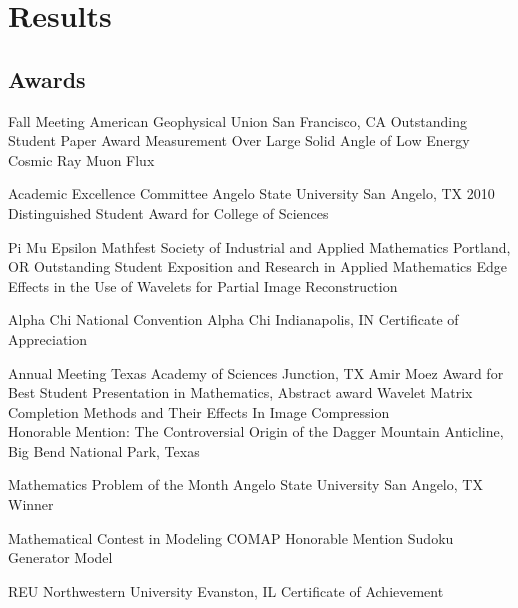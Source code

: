 \documentclass[10pt,letterpaper,english]{moderncv}
\begin{document}
\section{Results}
\subsection{Awards}

{Fall Meeting}
{American Geophysical Union}
{San Francisco, CA}
{Outstanding Student Paper Award}%
{Measurement Over Large Solid Angle of Low Energy Cosmic Ray Muon Flux}

{Academic Excellence Committee}
{Angelo State University}
{San Angelo, TX}
{2010 Distinguished Student Award for College of Sciences}

{Pi Mu Epsilon Mathfest}
{Society of Industrial and Applied Mathematics}
{Portland, OR}
{Outstanding Student Exposition and Research in Applied Mathematics}%
{Edge Effects in the Use of Wavelets for Partial Image Reconstruction}

{Alpha Chi National Convention}
{Alpha Chi}
{Indianapolis, IN}
{Certificate of Appreciation}

{Annual Meeting}
{Texas Academy of Sciences}
{Junction, TX}
{Amir Moez Award for Best Student Presentation in Mathematics, Abstract award}%
{Wavelet Matrix Completion Methods and Their Effects In Image Compression\\
\textnormal{Honorable Mention:}
The Controversial Origin of the Dagger Mountain Anticline, Big Bend National Park, Texas}


{Mathematics Problem of the Month}
{Angelo State University}
{San Angelo, TX}
{Winner}

{Mathematical Contest in Modeling}
{COMAP}
{}
{Honorable Mention}%
{Sudoku Generator Model}

{REU}
{Northwestern University}
{Evanston, IL}
{Certificate of Achievement}
\end{document}
